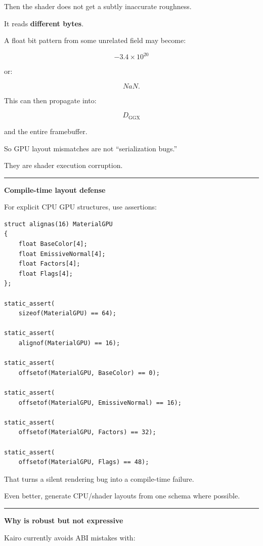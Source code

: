 Then the shader does not get a subtly inaccurate roughness.

It reads \textbf{different bytes}.

A float bit pattern from some unrelated field may become:

\[
-3.4\times10^{20}
\]

or:

\[
NaN.
\]

This can then propagate into:

\[
D_{\text{GGX}}
\]

and the entire framebuffer.

So GPU layout mismatches are not ``serialization bugs.''

They are shader execution corruption.

\begin{center}\rule{0.5\linewidth}{0.5pt}\end{center}

\textbf{Compile-time layout defense}

For explicit CPU GPU structures, use assertions:

\begin{verbatim}
struct alignas(16) MaterialGPU
{
    float BaseColor[4];
    float EmissiveNormal[4];
    float Factors[4];
    float Flags[4];
};

static_assert(
    sizeof(MaterialGPU) == 64);

static_assert(
    alignof(MaterialGPU) == 16);

static_assert(
    offsetof(MaterialGPU, BaseColor) == 0);

static_assert(
    offsetof(MaterialGPU, EmissiveNormal) == 16);

static_assert(
    offsetof(MaterialGPU, Factors) == 32);

static_assert(
    offsetof(MaterialGPU, Flags) == 48);
\end{verbatim}

That turns a silent rendering bug into a compile-time failure.

Even better, generate CPU/shader layouts from one schema where possible.

\begin{center}\rule{0.5\linewidth}{0.5pt}\end{center}

\textbf{Why  is robust but not expressive}

Kairo currently avoids ABI mistakes with:

